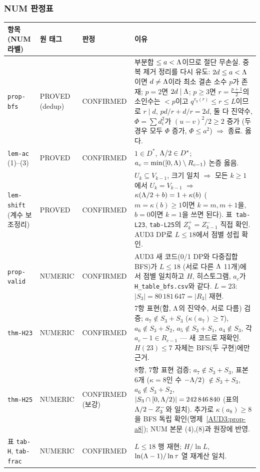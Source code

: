 \subsubsection{NUM 판정표}\label{AUD3:ssec-num-table}
\begin{center}\small
\begin{longtable}{p{}p{}p{}p{}}
\toprule
항목 (NUM 라벨) & 원 태그 & 판정 & 이유\\\midrule
\endhead
\texttt{prop-bfs} & PROVED (dedup) & CONFIRMED & 부분합 $\le a<\Lambda$이므로 절단 무손실. 중복 제거 정리를 다시 유도: $2d\le a<\Lambda$이면 $d\ne\Lambda$이라 최소 결손 소수 $p$가 존재; $p=2$면 $2d\mid\Lambda$; $p\ge3$면 $r=\frac{p+1}2$의 소인수는 $<p$이고 $q^{v_q(r)}\le r\le L$이므로 $r\mid d$, $pd/r+d/r=2d$, 둘 다 진약수, $\Phi=\sum d_i^2$가 $(u-v)^2/2\ge2$ 증가 (두 경우 모두 $\Phi$ 증가, $\Phi\le a^2$) $\Rightarrow$ 종료. 옳다.\\
\texttt{lem-ac} (1)--(3) & PROVED & CONFIRMED & $1\in D^*$, $\Lambda/2\in D^*$; $a_c=\min([0,\Lambda)\setminus R_{c-1})$ 논증 옳음.\\
\texttt{lem-shift} (계수 보조정리) & PROVED & CONFIRMED & $U_k\subseteq V_{k-1}$, 크기 일치 $\Rightarrow$ 모든 $k\ge1$에서 $U_k=V_{k-1}$ $\Rightarrow$ $\kappa(\Lambda/2+b)=1+\kappa(b)$ ($m=\kappa(b)\ge1$이면 $k=m,m+1$을, $b=0$이면 $k=1$을 쓰면 된다). 표~\texttt{tab-L23}, \texttt{tab-L25}의 $Z^+_k=Z^-_{k-1}$ 직접 확인. AUD3 DP로 $L\le18$에서 점별 성립 확인.\\
\texttt{prop-valid} & NUMERIC & CONFIRMED & AUD3 새 코드(0/1 DP와 다중집합 BFS)가 $L\le18$ (서로 다른 $\Lambda$ 11개)에서 점별 일치하고 $H$, 히스토그램, $a_c$가 \texttt{H\_table\_bfs.csv}와 같다. $L=23$: $|S_3|=80\,181\,647=|R_3|$ 재현.\\
\texttt{thm-H23} & NUMERIC & CONFIRMED & 7항 표현(합, $\Lambda$의 진약수, 서로 다름) 검증; $a_7\notin S_3+S_3$ ($\kappa(a_7)\ge7$), $a_6\notin S_3+S_2$, $a_5\notin S_3+S_1$, $a_4\notin S_3$, 각 $a_c-1\in R_{c-1}$ --- 새 코드로 재확인. $H(23)\le7$ 자체는 BFS(두 구현)에만 근거.\\
\texttt{thm-H25} & NUMERIC & CONFIRMED (보강) & 8항, 7항 표현 검증; $a_7\notin S_3+S_3$, 표본 6개 ($\kappa=8$인 수 $-\Lambda/2$) $\notin S_3+S_3$, $a_6\notin S_3+S_2$, $|S_3\cap[0,\Lambda/2)|=242\,846\,840$ (표의 $\Lambda/2-Z^-_3$와 일치). 추가로 $\kappa(a_8)\ge8$을 BFS 독립 확인(명제~\ref{AUD3:prop-a8}); NUM 본문 (4),(8)과 원장에 반영.\\
표 \texttt{tab-H}, \texttt{tab-frac} & NUMERIC & CONFIRMED & $L\le18$ 행 재현; $H/\ln L$, $\ln(\Lambda-1)/\ln\tau$ 열 재계산 일치.\\

\end{longtable}
\end{center}
